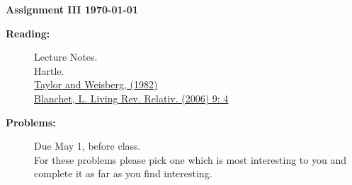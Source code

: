 \documentclass[11pt]{article}
\begin{document}
%
\centerline{\large\bf  \hfill Assignment III \hfill  \today}

\medskip
\begin{description}
\item[{\bf Reading:}] 
Lecture Notes. \\
Hartle. \\
\href{https://doi.org/10.1086/159690}{Taylor and Weisberg, (1982)} \\
\href{https://doi.org/10.12942/lrr-2006-4}{Blanchet, L. Living Rev. Relativ. (2006) 9: 4}

\item[{\bf Problems:} \hfill ] Due May 1, before class. \\
For these problems please pick one which is most interesting to you and complete it as far as you find interesting.
\end{description}


\medskip
\end{document}
